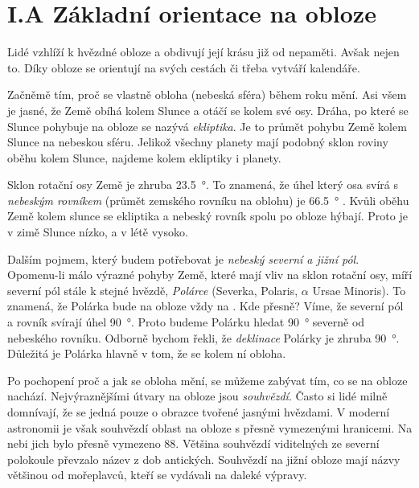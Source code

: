 \documentclass{../../../../style/mkimain}
\begin{document}
\section*{I.A Základní orientace na obloze}


Lidé vzhlíží k hvězdné obloze a obdivují její krásu již od nepaměti.
Avšak nejen to.
Díky obloze se orientují na svých cestách či třeba vytváří kalendáře.

Začněmě tím, proč se vlastně obloha (nebeská sféra) během roku mění.
Asi všem je jasné, že Země obíhá kolem Slunce a otáčí se kolem své osy.
Dráha, po které se Slunce pohybuje na obloze se nazývá \textit{ekliptika}. Je to průmět pohybu Země kolem Slunce na nebeskou sféru.
Jelikož všechny planety mají podobný sklon roviny oběhu kolem Slunce, najdeme kolem ekliptiky i planety.

Sklon rotační osy Země je zhruba \qty{23,5}{\degree}.
To znamená, že úhel který osa svírá s \textit{nebeským rovníkem} (průmět zemského rovníku na oblohu) je \qty{66,5}{\degree} . 
Kvůli oběhu Země kolem slunce se ekliptika a nebeský rovník spolu po obloze hýbají.
Proto je v zimě Slunce nízko, a v létě vysoko.

Dalším pojmem, který budem potřebovat je \textit{nebeský severní a jižní pól}.
Opomenu-li málo výrazné pohyby Země, které mají vliv na sklon rotační osy, míří severní pól stále k stejné hvězdě, \textit{Polárce} (Severka, Polaris, $\alpha$ Ursae Minoris).
To znamená, že Polárka bude na obloze vždy na .
Kde přesně?
Víme, že severní pól a rovník svírají úhel \qty{90}{\degree}. Proto budeme Polárku hledat \qty{90}{\degree} severně od nebeského rovníku. 
Odborně bychom řekli, že \textit{deklinace} Polárky je zhruba \qty{90}{\degree}.
Důležitá je Polárka hlavně v tom, že se kolem ní  obloha. 

Po pochopení proč a jak se obloha mění, se můžeme zabývat tím, co se na obloze nachází.
Nejvýraznějšími útvary na obloze jsou \textit{souhvězdí}.
Často si lidé milně domnívají, že se jedná pouze o obrazce tvořené jasnými hvězdami.
V moderní astronomii je však souhvězdí oblast na obloze s přesně vymezenými hranicemi.
Na nebi jich bylo přesně vymezeno 88. Většina souhvězdí  viditelných ze  severní polokoule převzalo název z dob antických.
Souhvězdí na jižní obloze mají názvy většinou od mořeplavců, kteří se vydávali na daleké výpravy.
\end{document}
